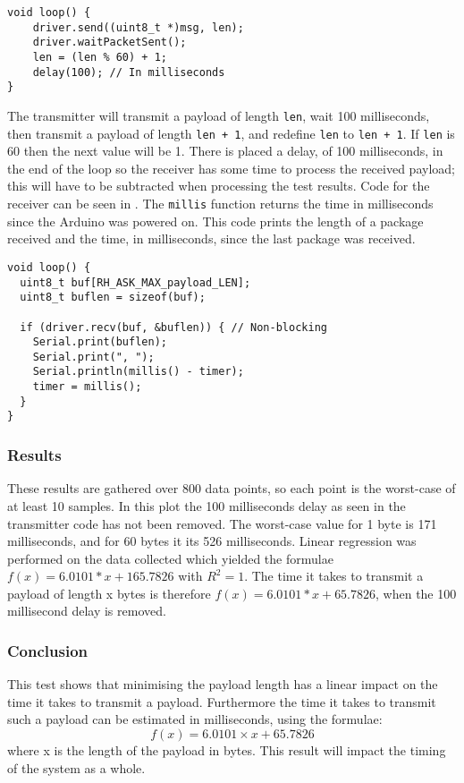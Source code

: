 \begin{lstlisting}[style=customc,float,floatplacement=!h,caption={The core of the transmitter code.},label={lst:transtestcore}]
void loop() {
    driver.send((uint8_t *)msg, len);
    driver.waitPacketSent();
    len = (len % 60) + 1;
    delay(100); // In milliseconds 
}
\end{lstlisting}

The transmitter will transmit a payload of length \texttt{len}, wait 100 milliseconds, then transmit a payload of length \texttt{len + 1}, and redefine \texttt{len} to \texttt{len + 1}.
If \texttt{len} is 60 then the next value will be 1. 
There is placed a delay, of 100 milliseconds, in the end of the loop so the receiver has some time to process the received payload; this will have to be subtracted when processing the test results.
Code for the receiver can be seen in .
The \texttt{millis} function returns the time in milliseconds since the Arduino was powered on. 
This code prints the length of a package received and the time, in milliseconds, since the last package was received.

\begin{lstlisting}[style=customc,float,floatplacement=!h,caption={The core of the receiver code.},label={lst:recvtestcore}]
void loop() {
  uint8_t buf[RH_ASK_MAX_payload_LEN];
  uint8_t buflen = sizeof(buf);

  if (driver.recv(buf, &buflen)) { // Non-blocking
    Serial.print(buflen);
    Serial.print(", ");
    Serial.println(millis() - timer);
    timer = millis();
  }
}
\end{lstlisting}


\subsubsection*{Results}
These results are gathered over 800 data points, so each point is the worst-case of at least 10 samples. 
In this plot the 100 milliseconds delay as seen in the transmitter code has not been removed.
The worst-case value for 1 byte is 171 milliseconds, and for 60 bytes it its 526 milliseconds. 
Linear regression was performed on the data collected which yielded the formulae $f(x)=6.0101 * x + 165.7826$ with $R^2 = 1$. 
The time it takes to transmit a payload of length x bytes is therefore $f(x)=6.0101 * x + 65.7826$, when the 100 millisecond delay is removed.

\subsubsection*{Conclusion}
This test shows that minimising the payload length has a linear impact on the time it takes to transmit a payload. 
Furthermore the time it takes to transmit such a payload can be estimated in milliseconds, using the formulae: 
\begin{equation}
f(x)=6.0101 \times x + 65.7826 
\label{eq:timeToSendFormular}   
\end{equation}
where x is the length of the payload in bytes. 
This result will impact the timing of the system as a whole.  
